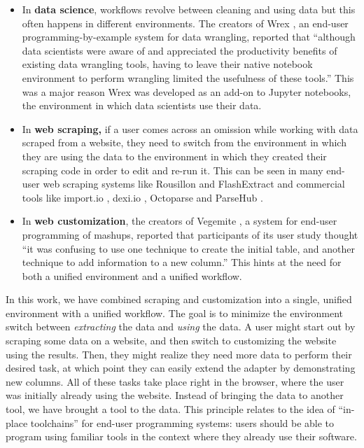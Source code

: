 \documentclass[sigconf,10pt]{acmart}
\providecommand{\tightlist}{%
  \setlength{\itemsep}{0pt}\setlength{\parskip}{0pt}}
\begin{document}
\begin{itemize}
\tightlist
\item
  In \textbf{data science}, workflows revolve between cleaning and using
  data but this often happens in different environments. The creators of
  Wrex \citep{drosos2020}, an end-user programming-by-example system for
  data wrangling, reported that ``although data scientists were aware of
  and appreciated the productivity benefits of existing data wrangling
  tools, having to leave their native notebook environment to perform
  wrangling limited the usefulness of these tools.'' This was a major
  reason Wrex was developed as an add-on to Jupyter notebooks, the
  environment in which data scientists use their data.
\item
  In \textbf{web scraping,} if a user comes across an omission while
  working with data scraped from a website, they need to switch from the
  environment in which they are using the data to the environment in
  which they created their scraping code in order to edit and re-run it.
  This can be seen in many end-user web scraping systems like Rousillon
  \citep{chasins2018}and FlashExtract \citep{le2014} and commercial
  tools like import.io \citep{import.io}, dexi.io \citep{dexi.io},
  Octoparse \citep{octoparse} and ParseHub \citep{parsehub}.
\item
  In \textbf{web customization}, the creators of Vegemite
  \citep{lin2009}, a system for end-user programming of mashups,
  reported that participants of its user study thought ``it was
  confusing to use one technique to create the initial table, and
  another technique to add information to a new column.'' This hints at
  the need for both a unified environment and a unified workflow.
\end{itemize}

In this work, we have combined scraping and customization into a single,
unified environment with a unified workflow. The goal is to minimize the
environment switch between \emph{extracting} the data and \emph{using}
the data. A user might start out by scraping some data on a website, and
then switch to customizing the website using the results. Then, they
might realize they need more data to perform their desired task, at
which point they can easily extend the adapter by demonstrating new
columns. All of these tasks take place right in the browser, where the
user was initially already using the website. Instead of bringing the
data to another tool, we have brought a tool to the data. This principle
relates to the idea of ``in-place toolchains'' \citep{zotero-1362} for
end-user programming systems: users should be able to program using
familiar tools in the context where they already use their software.
\end{document}
